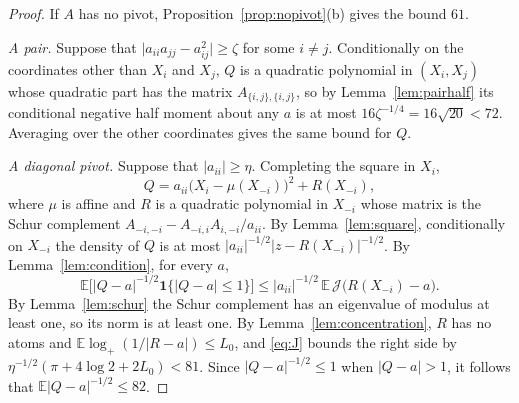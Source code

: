 \documentclass[11pt]{amsart}
\numberwithin{equation}{section}
\theoremstyle{definition}
\theoremstyle{remark}
\newcommand{\E}{\mathbb E}
\newcommand{\1}{\mathbf 1}
\newcommand{\logp}{\log_+}
\newcommand{\abs}[1]{\lvert #1\rvert}
\begin{document}
\begin{proof}
If $A$ has no pivot, Proposition~\ref{prop:nopivot}(b) gives the bound $61$.

\emph{A pair.} Suppose that $\abs{a_{ii}a_{jj}-a_{ij}^2}\ge\zeta$ for some $i\ne j$. Conditionally on the coordinates other than $X_i$ and $X_j$, $Q$ is a quadratic polynomial in $(X_i,X_j)$ whose quadratic part has the matrix $A_{\{i,j\},\{i,j\}}$, so by Lemma~\ref{lem:pairhalf} its conditional negative half moment about any $a$ is at most $16\zeta^{-1/4}=16\sqrt{20}<72$. Averaging over the other coordinates gives the same bound for $Q$.

\emph{A diagonal pivot.} Suppose that $\abs{a_{ii}}\ge\eta$. Completing the square in $X_i$,
\begin{equation}\label{eq:profile}
Q=a_{ii}\bigl(X_i-\mu(X_{-i})\bigr)^2+R(X_{-i}),
\end{equation}
where $\mu$ is affine and $R$ is a quadratic polynomial in $X_{-i}$ whose matrix is the Schur complement $A_{-i,-i}-A_{-i,i}A_{i,-i}/a_{ii}$. By Lemma~\ref{lem:square}, conditionally on $X_{-i}$ the density of $Q$ is at most $\abs{a_{ii}}^{-1/2}\abs{z-R(X_{-i})}^{-1/2}$. By Lemma~\ref{lem:condition}, for every $a$,
\[
\E\bigl[\abs{Q-a}^{-1/2}\1\{\abs{Q-a}\le1\}\bigr]\le\abs{a_{ii}}^{-1/2}\,\E\,\mathcal J\bigl(R(X_{-i})-a\bigr).
\]
By Lemma~\ref{lem:schur} the Schur complement has an eigenvalue of modulus at least one, so its norm is at least one. By Lemma~\ref{lem:concentration}, $R$ has no atoms and $\E\logp(1/\abs{R-a})\le L_0$, and \eqref{eq:J} bounds the right side by $\eta^{-1/2}(\pi+4\log2+2L_0)<81$. Since $\abs{Q-a}^{-1/2}\le1$ when $\abs{Q-a}>1$, it follows that $\E\abs{Q-a}^{-1/2}\le82$.
\end{proof}
\end{document}
